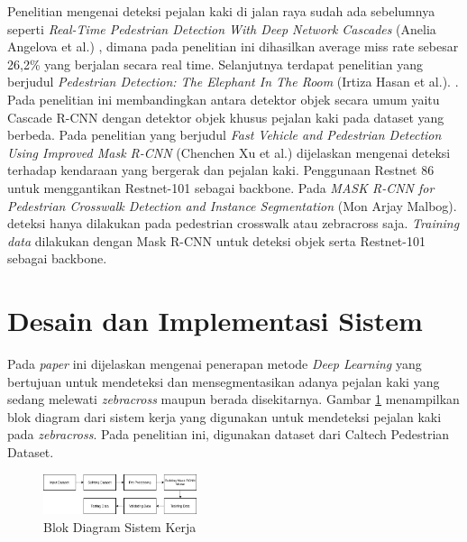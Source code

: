 \documentclass[conference]{IEEEtran}
\begin{document}
	Penelitian mengenai deteksi pejalan kaki di jalan raya sudah ada sebelumnya seperti \textit{Real-Time Pedestrian Detection With Deep Network Cascades} (Anelia Angelova et al.) \cite{cit:1}, dimana pada penelitian ini dihasilkan average miss rate sebesar 26,2\% yang berjalan secara real time. Selanjutnya terdapat penelitian yang berjudul \textit{Pedestrian Detection: The Elephant In The Room} (Irtiza Hasan et al.). \cite{cit:2}. Pada penelitian ini membandingkan antara detektor objek secara umum yaitu Cascade R-CNN dengan detektor objek khusus pejalan kaki pada dataset yang berbeda. Pada penelitian yang berjudul \textit{Fast Vehicle and Pedestrian Detection Using Improved Mask R-CNN} (Chenchen Xu et al.) \cite{cit:3} dijelaskan mengenai deteksi terhadap kendaraan yang bergerak dan pejalan kaki. Penggunaan Restnet 86 untuk menggantikan Restnet-101 sebagai backbone. Pada \textit{MASK R-CNN for Pedestrian Crosswalk Detection and Instance Segmentation} (Mon Arjay Malbog). \cite{cit:4} deteksi hanya dilakukan pada pedestrian crosswalk atau zebracross saja. \textit{Training data} dilakukan dengan Mask R-CNN untuk deteksi objek serta Restnet-101 sebagai backbone.
	
	\section{Desain dan Implementasi Sistem}
	\vspace{1ex}
	Pada \textit{paper} ini dijelaskan mengenai penerapan metode \textit{Deep Learning} yang bertujuan untuk mendeteksi dan mensegmentasikan adanya pejalan kaki yang sedang melewati \textit{zebracross} maupun berada disekitarnya. Gambar \ref{fig:1} menampilkan blok diagram dari sistem kerja yang digunakan untuk mendeteksi pejalan kaki pada \textit{zebracross}. Pada penelitian ini, digunakan dataset dari Caltech Pedestrian Dataset.
	\vspace{1ex}
	\begin{figure}[!ht] \centering
		\includegraphics[width=0.4\textwidth]{img/blok-diagram.png}
		\caption{Blok Diagram Sistem Kerja}
		\label{fig:1}
	\end{figure}
\end{document}
